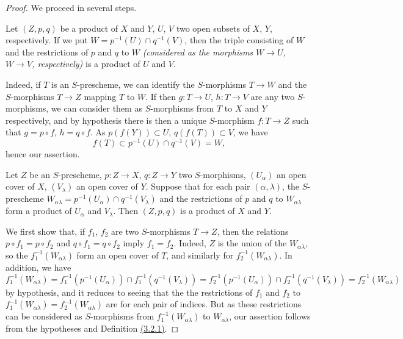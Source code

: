 \begin{proof}
\label{proof-thm-1.3.2.6}
We proceed in several steps.

\begin{lem}[3.2.6.1]
\label{lem-1.3.2.6.1}
Let $(Z,p,q)$ be a product of $X$ and $Y$, $U$, $V$ two open subsets of $X$, $Y$,
respectively. If we put $W=p^{-1}(U)\cap q^{-1}(V)$, then the triple consisting of $W$ and
the restrictions of $p$ and $q$ to $W$ {\em (considered as the morphisms $W\to U$, $W\to V$,
respectively)} is a product of $U$ and $V$.
\end{lem}

Indeed, if $T$ is an $S$-prescheme, we can identify the $S$-morphisms $T\to W$ and the
$S$-morphisms $T\to Z$ mapping $T$ to $W$. If then $g:T\to U$, $h:T\to V$ are any two
$S$-morphisms, we can consider them as $S$-morphisms from $T$ to $X$ and $Y$ respectively,
and by hypothesis there is then a unique $S$-morphism $f:T\to Z$ such that $g=p\circ f$,
$h=q\circ f$. As $p(f(Y))\subset U$, $q(f(T))\subset V$, we have
\[
  f(T)\subset p^{-1}(U)\cap q^{-1}(V)=W,
\]
hence our assertion.

\begin{lem}[3.2.6.2]
\label{lem-1.3.2.6.2}
Let $Z$ be an $S$-prescheme, $p:Z\to X$, $q:Z\to Y$ two $S$-morphisms, $(U_\alpha)$ an open
cover of $X$, $(V_\lambda)$ an open cover of $Y$. Suppose that for each pair
$(\alpha,\lambda)$, the $S$-prescheme
$W_{\alpha\lambda}=p^{-1}(U_\alpha)\cap q^{-1}(V_\lambda)$ and the restrictions of $p$ and
$q$ to $W_{\alpha\lambda}$ form a product of $U_\alpha$ and $V_\lambda$. Then $(Z,p,q)$ is a
product of $X$ and $Y$.
\end{lem}

We first show that, if $f_1$, $f_2$ are two $S$-morphisms $T\to Z$, then the relations
$p\circ f_1=p\circ f_2$ and $q\circ f_1=q\circ f_2$ imply $f_1=f_2$. Indeed, $Z$ is the union
of the $W_{\alpha\lambda}$, so the $f_1^{-1}(W_{\alpha\lambda})$ form an open cover of $T$,
and similarly for $f_2^{-1}(W_{\alpha\lambda})$. In addition, we have
\[
  f_1^{-1}(W_{\alpha\lambda})=f_1^{-1}(p^{-1}(U_\alpha))\cap f_1^{-1}(q^{-1}(V_\lambda))
  =f_2^{-1}(p^{-1}(U_\alpha))\cap f_2^{-1}(q^{-1}(V_\lambda))=f_2^{-1}(W_{\alpha\lambda})
\]
by hypothesis, and it reduces to seeing that the the restrictions of $f_1$ and $f_2$ to
$f_1^{-1}(W_{\alpha\lambda})=f_2^{-1}(W_{\alpha\lambda})$ are  for each pair of
indices. But as these restrictions can be considered as $S$-morphisms from
$f_1^{-1}(W_{\alpha\lambda})$ to $W_{\alpha\lambda}$, our assertion follows from the
hypotheses and Definition \hyperref[defn-1.3.2.1]{(3.2.1)}.


\end{proof}
